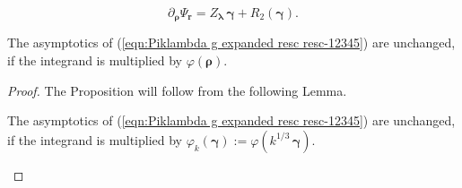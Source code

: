 \documentclass[10pt,a4paper]{amsart}
\begin{document}
\begin{equation}
\label{eqn:xi derv}
\partial_{\boldsymbol{\rho}}
\Psi_{\mathbf{r}}=Z_{\boldsymbol{\lambda}}\,
\boldsymbol{\gamma}+R_2(\boldsymbol{\gamma}).
\end{equation}

\begin{prop}
\label{prop:rho comp supp}
The asymptotics of (\ref{eqn:Piklambda g expanded resc resc-12345}) are unchanged, if the integrand is 
multiplied by $\varphi(\boldsymbol{\rho})$.
\end{prop}

\begin{proof} The Proposition will follow from
the following Lemma.

\begin{lem}
The asymptotics of (\ref{eqn:Piklambda g expanded resc resc-12345}) are unchanged, if the integrand is 
multiplied by $\varphi_k(\boldsymbol{\gamma}):=
\varphi\left(k^{1/3}\,\boldsymbol{\gamma}  \right)$.
\end{lem}


\end{proof}
\end{document}
